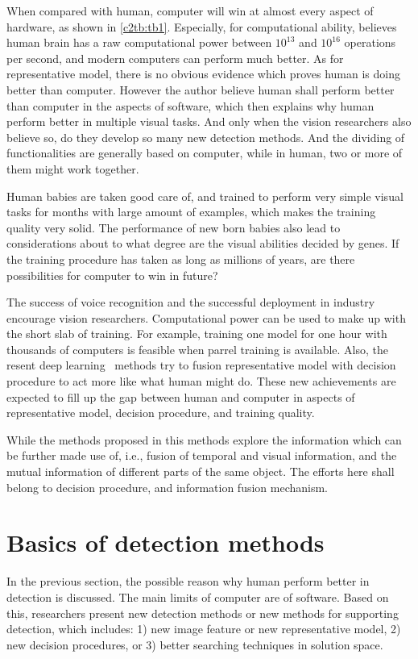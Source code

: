 When compared with human, computer will win at almost every aspect of hardware, as shown in \ref{c2tb:tb1}. Especially, for computational ability, \cite{bpw} believes human brain has a raw computational power between $10^{13}$ and $10^{16}$ operations per second, and modern computers can perform much better. As for representative model, there is no obvious evidence which proves human is doing better than computer. However the author believe human shall perform better than computer in the aspects of software, which then explains why human perform better in multiple visual tasks. And only when the vision researchers also believe so, do they develop  so many new detection methods. And the  dividing of functionalities  are generally based on computer, while in human, two or more of them might work together.

Human babies are taken good care of, and trained to perform very simple visual tasks for months with large amount of examples, which makes the training quality very solid. The performance of new born babies also lead to considerations about to what degree are the visual abilities decided by genes. If the training procedure has taken as long as millions of years, are there possibilities for computer to win in future?

The success of voice recognition and the successful deployment in industry~\cite{siri} encourage vision researchers.  Computational power can be used to make up with the short slab of training. For example, training one model for one hour with thousands of computers is feasible when parrel training is available. Also, the resent deep learning~\cite{dlearn} methods try to fusion representative model with decision procedure to act more like what human might do. These new achievements are expected to fill up the gap between human and computer in aspects of representative model, decision procedure, and training quality.

While the methods proposed in this methods explore the information which can be further made use of, i.e., fusion of temporal and visual information, and the mutual information of different parts of the same object. The efforts here shall belong to decision procedure, and information fusion mechanism. 


\section{Basics of detection methods}

In the previous section, the possible reason why human perform better in detection is discussed. The main limits of computer are of software. Based on this, researchers present new detection methods or new methods for supporting detection, which includes: 1) new image feature or new representative model, 2) new decision procedures, or 3) better searching techniques in solution space.
